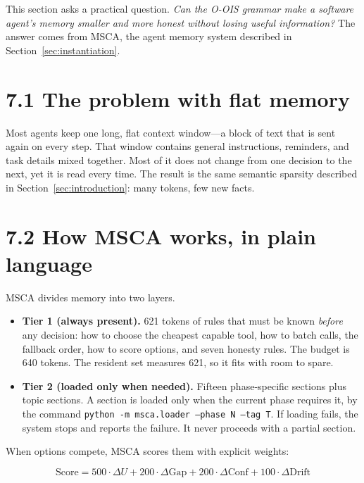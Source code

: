 \label{sec:agent_context}

This section asks a practical question. \textit{Can the O-OIS grammar make a software agent's memory smaller and more honest without losing useful information?} The answer comes from MSCA, the agent memory system described in Section~\ref{sec:instantiation}.

\section*{7.1 The problem with flat memory}

Most agents keep one long, flat context window---a block of text that is sent again on every step. That window contains general instructions, reminders, and task details mixed together. Most of it does not change from one decision to the next, yet it is read every time. The result is the same semantic sparsity described in Section~\ref{sec:introduction}: many tokens, few new facts.

\section*{7.2 How MSCA works, in plain language}

MSCA divides memory into two layers.

\begin{itemize}
\item \textbf{Tier 1 (always present).} 621 tokens of rules that must be known \textit{before} any decision: how to choose the cheapest capable tool, how to batch calls, the fallback order, how to score options, and seven honesty rules. The budget is 640 tokens. The resident set measures 621, so it fits with room to spare.
\item \textbf{Tier 2 (loaded only when needed).} Fifteen phase-specific sections plus topic sections. A section is loaded only when the current phase requires it, by the command \texttt{python -m msca.loader --phase N --tag T}. If loading fails, the system stops and reports the failure. It never proceeds with a partial section.
\end{itemize}

When options compete, MSCA scores them with explicit weights:

\begin{equation}
\text{Score} = 500 \cdot \Delta U + 200 \cdot \Delta \text{Gap} + 200 \cdot \Delta \text{Conf} + 100 \cdot \Delta \text{Drift}
\end{equation}

